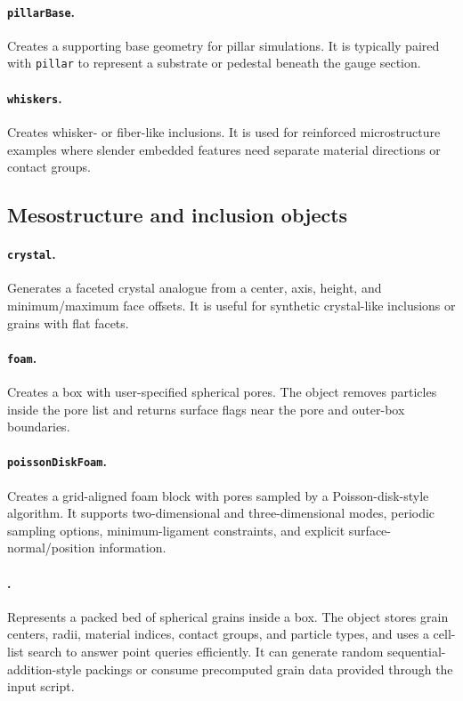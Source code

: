 \paragraph{\texttt{pillarBase}.}Creates a supporting base geometry for pillar simulations.  It is typically paired with \texttt{pillar} to represent a substrate or pedestal beneath the gauge section.

\paragraph{\texttt{whiskers}.}Creates whisker- or fiber-like inclusions.  It is used for reinforced microstructure examples where slender embedded features need separate material directions or contact groups.

\subsection{Mesostructure and inclusion objects}

\paragraph{\texttt{crystal}.}Generates a faceted crystal analogue from a center, axis, height, and minimum/maximum face offsets.  It is useful for synthetic crystal-like inclusions or grains with flat facets.

\paragraph{\texttt{foam}.}Creates a box with user-specified spherical pores.  The object removes particles inside the pore list and returns surface flags near the pore and outer-box boundaries.

\paragraph{\texttt{poissonDiskFoam}.}Creates a grid-aligned foam block with pores sampled by a Poisson-disk-style algorithm.  It supports two-dimensional and three-dimensional modes, periodic sampling options, minimum-ligament constraints, and explicit surface-normal/position information.

\paragraph{.}Represents a packed bed of spherical grains inside a box.  The object stores grain centers, radii, material indices, contact groups, and particle types, and uses a cell-list search to answer point queries efficiently.  It can generate random sequential-addition-style packings or consume precomputed grain data provided through the input script.


